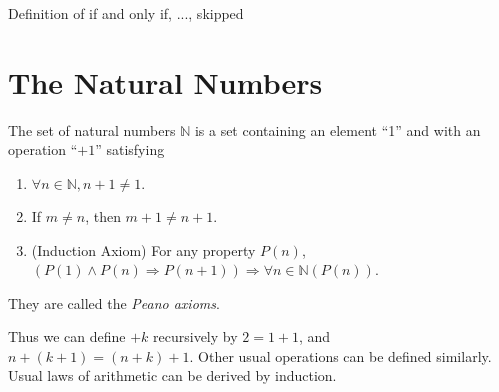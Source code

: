 \documentclass[10pt]{article}
\begin{document}
	Definition of if and only if, ..., skipped

	\section{The Natural Numbers}
	\begin{definition}
		The set of natural numbers $ \mathbb{N} $ is a set containing an element “1” and with an operation “$+1$” satisfying
		\begin{enumerate}[(1)]
			\item $ \forall n\in \mathbb{N}, n+1\neq 1. $
			\item If $ m\neq n $, then $ m+1\neq n+1. $ 
			\item (Induction Axiom) For any property $P(n)$, $ (P(1)\land P(n)\Rightarrow P(n+1)) \Rightarrow \forall n\in \mathbb{N} (P(n))$.
		\end{enumerate}
		They are called the \textit{Peano axioms}.
	\end{definition}
	Thus we can define $ +k $ recursively by $ 2=1+1 $, and $ n+(k+1)=(n+k)+1 $. Other usual operations can be defined similarly. Usual laws of arithmetic can be derived by induction.
\end{document}
